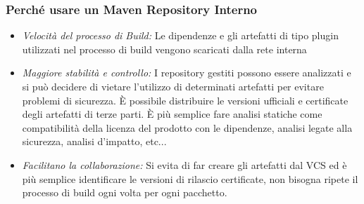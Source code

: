 \documentclass[10pt, a4paper]{article}
\begin{document}
\subsubsection*{Perché usare un Maven Repository Interno}
\begin{itemize}
    \item \textit{Velocità del processo di Build:} Le dipendenze e gli artefatti di tipo plugin utilizzati nel
processo di build vengono scaricati dalla rete interna
    \item \textit{Maggiore stabilità e controllo:} I repository gestiti possono essere analizzati e si può
decidere di vietare l’utilizzo di determinati artefatti per evitare problemi di sicurezza. È
possibile distribuire le versioni ufficiali e certificate degli artefatti di terze parti. È più
semplice fare analisi statiche come compatibilità della licenza del prodotto con le dipendenze, analisi legate alla sicurezza, analisi d'impatto, etc...
    \item \textit{Facilitano la collaborazione:} Si evita di far creare gli artefatti dal VCS ed è più semplice
identificare le versioni di rilascio certificate, non bisogna ripete il processo di build ogni volta per ogni pacchetto.
\end{itemize}
\end{document}
